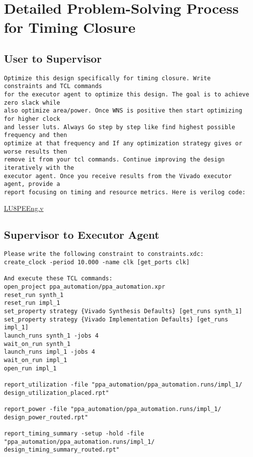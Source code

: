 \section{Detailed Problem-Solving Process for Timing Closure}\label{appendix:ppa-chat}
\subsection{User to Supervisor}
\vspace{-0.5em}
\begin{userbox}
\begin{lstlisting}
Optimize this design specifically for timing closure. Write constraints and TCL commands 
for the executor agent to optimize this design. The goal is to achieve zero slack while 
also optimize area/power. Once WNS is positive then start optimizing for higher clock 
and lesser luts. Always Go step by step like find highest possible frequency and then 
optimize at that frequency and If any optimization strategy gives or worse results then 
remove it from your tcl commands. Continue improving the design iteratively with the 
executor agent. Once you receive results from the Vivado executor agent, provide a 
report focusing on timing and resource metrics. Here is verilog code:
\end{lstlisting}
\href{https://github.com/verilog-to-routing/vtr-verilog-to-routing/blob/master/vtr_flow/benchmarks/verilog/LU8PEEng.v}{LU8PEEng.v}
\end{userbox}

\subsection{Supervisor to Executor Agent}
\vspace{-0.5em}
\begin{supervisorbox}
\begin{lstlisting}
Please write the following constraint to constraints.xdc:
create_clock -period 10.000 -name clk [get_ports clk]

And execute these TCL commands:
open_project ppa_automation/ppa_automation.xpr
reset_run synth_1
reset_run impl_1
set_property strategy {Vivado Synthesis Defaults} [get_runs synth_1]
set_property strategy {Vivado Implementation Defaults} [get_runs impl_1]
launch_runs synth_1 -jobs 4
wait_on_run synth_1
launch_runs impl_1 -jobs 4
wait_on_run impl_1
open_run impl_1

report_utilization -file "ppa_automation/ppa_automation.runs/impl_1/
design_utilization_placed.rpt"

report_power -file "ppa_automation/ppa_automation.runs/impl_1/
design_power_routed.rpt"

report_timing_summary -setup -hold -file "ppa_automation/ppa_automation.runs/impl_1/
design_timing_summary_routed.rpt"
\end{lstlisting}
\end{supervisorbox}


